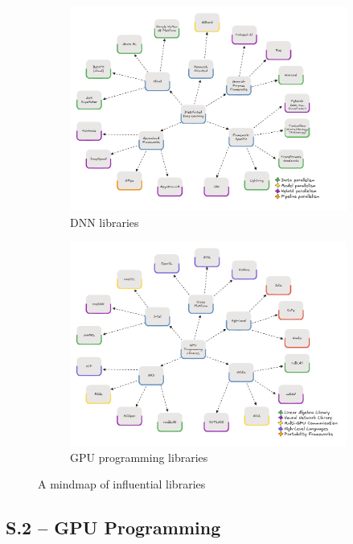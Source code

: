 \begin{figure}
	\centering
	\begin{subfigure}{0.48\linewidth}
		\includegraphics[width=\textwidth]{figures/mindmap}
		\caption{DNN libraries}
		\label{fig:mindmap-dnn}
	\end{subfigure}
	\hfill
	\begin{subfigure}{0.48\linewidth}
		\includegraphics[width=\textwidth]{figures/mindmap-cuda}
		\caption{GPU programming libraries}
		\label{fig:mindmap-cuda}
	\end{subfigure}
	\caption{A mindmap of influential libraries}
	\label{fig:mindmap}
\end{figure}

\subsection{S.2 -- GPU Programming}
\label{sec:gpu-studies}


